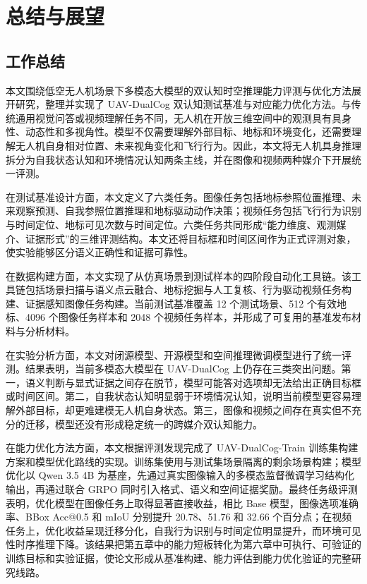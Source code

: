 
\chapter{总结与展望}

\section{工作总结}

本文围绕低空无人机场景下多模态大模型的双认知时空推理能力评测与优化方法展开研究，整理并实现了 UAV-DualCog 双认知测试基准与对应能力优化方法。与传统通用视觉问答或视频理解任务不同，无人机在开放三维空间中的观测具有具身性、动态性和多视角性。模型不仅需要理解外部目标、地标和环境变化，还需要理解无人机自身相对位置、未来视角变化和飞行行为。因此，本文将无人机具身推理拆分为自我状态认知和环境情况认知两条主线，并在图像和视频两种媒介下开展统一评测。

在测试基准设计方面，本文定义了六类任务。图像任务包括地标参照位置推理、未来观察预测、自我参照位置推理和地标驱动动作决策；视频任务包括飞行行为识别与时间定位、地标可见次数与时间定位。六类任务共同形成“能力维度、观测媒介、证据形式”的三维评测结构。本文还将目标框和时间区间作为正式评测对象，使实验能够区分语义正确性和证据可靠性。

在数据构建方面，本文实现了从仿真场景到测试样本的四阶段自动化工具链。该工具链包括场景扫描与语义点云融合、地标挖掘与人工复核、行为驱动视频任务构建、证据感知图像任务构建。当前测试基准覆盖 12 个测试场景、512 个有效地标、4096 个图像任务样本和 2048 个视频任务样本，并形成了可复用的基准发布材料与分析材料。

在实验分析方面，本文对闭源模型、开源模型和空间推理微调模型进行了统一评测。结果表明，当前多模态大模型在 UAV-DualCog 上仍存在三类突出问题。第一，语义判断与显式证据之间存在脱节，模型可能答对选项却无法给出正确目标框或时间区间。第二，自我状态认知明显弱于环境情况认知，说明当前模型更容易理解外部目标，却更难建模无人机自身状态。第三，图像和视频之间存在真实但不充分的迁移，模型还没有形成稳定统一的跨媒介双认知能力。

在能力优化方法方面，本文根据评测发现完成了 UAV-DualCog-Train 训练集构建方案和模型优化路线的实现。训练集使用与测试集场景隔离的剩余场景构建；模型优化以 Qwen 3.5 4B 为基座，先通过真实图像输入的多模态监督微调学习结构化输出，再通过联合 GRPO 同时引入格式、语义和空间证据奖励。最终任务级评测表明，优化模型在图像任务上取得显著直接收益，相比 Base 模型，图像选项准确率、BBox Acc@0.5 和 mIoU 分别提升 20.78、51.76 和 32.66 个百分点；在视频任务上，优化收益呈现迁移分化，自我行为识别与时间定位明显提升，而环境可见性时序推理下降。该结果把第五章中的能力短板转化为第六章中可执行、可验证的训练目标和实验证据，使论文形成从基准构建、能力评估到能力优化验证的完整研究线路。

